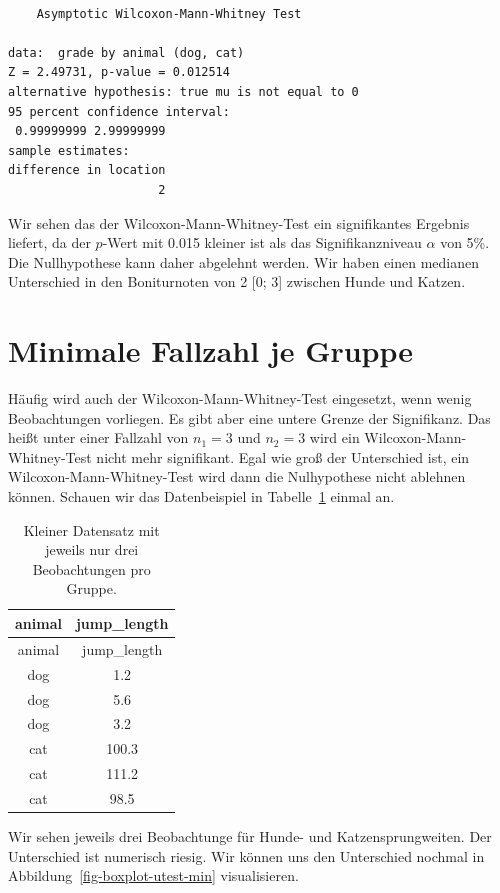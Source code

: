 \documentclass[
  letterpaper,
]{scrbook}
\begin{document}
\begin{verbatim}

    Asymptotic Wilcoxon-Mann-Whitney Test

data:  grade by animal (dog, cat)
Z = 2.49731, p-value = 0.012514
alternative hypothesis: true mu is not equal to 0
95 percent confidence interval:
 0.99999999 2.99999999
sample estimates:
difference in location 
                     2 
\end{verbatim}

Wir sehen das der Wilcoxon-Mann-Whitney-Test ein signifikantes Ergebnis
liefert, da der \(p\)-Wert mit 0.015 kleiner ist als das
Signifikanzniveau \(\alpha\) von 5\%. Die Nullhypothese kann daher
abgelehnt werden. Wir haben einen medianen Unterschied in den
Boniturnoten von 2 {[}0; 3{]} zwischen Hunde und Katzen.

\hypertarget{minimale-fallzahl-je-gruppe}{%
\section{Minimale Fallzahl je
Gruppe}\label{minimale-fallzahl-je-gruppe}}

Häufig wird auch der Wilcoxon-Mann-Whitney-Test eingesetzt, wenn wenig
Beobachtungen vorliegen. Es gibt aber eine untere Grenze der
Signifikanz. Das heißt unter einer Fallzahl von \(n_1 = 3\) und
\(n_2 = 3\) wird ein Wilcoxon-Mann-Whitney-Test nicht mehr signifikant.
Egal wie groß der Unterschied ist, ein Wilcoxon-Mann-Whitney-Test wird
dann die Nulhypothese nicht ablehnen können. Schauen wir das
Datenbeispiel in Tabelle~\ref{tbl-data-utest-2} einmal an.

\hypertarget{tbl-data-utest-2}{}
\begin{longtable}[]{@{}cc@{}}
\caption{\label{tbl-data-utest-2}Kleiner Datensatz mit jeweils nur drei
Beobachtungen pro Gruppe.}\tabularnewline
\toprule()
animal & jump\_length \\
\midrule()
\endfirsthead
\toprule()
animal & jump\_length \\
\midrule()
\endhead
dog & 1.2 \\
dog & 5.6 \\
dog & 3.2 \\
cat & 100.3 \\
cat & 111.2 \\
cat & 98.5 \\
\bottomrule()
\end{longtable}

Wir sehen jeweils drei Beobachtunge für Hunde- und Katzensprungweiten.
Der Unterschied ist numerisch riesig. Wir können uns den Unterschied
nochmal in Abbildung~\ref{fig-boxplot-utest-min} visualisieren.
\end{document}
